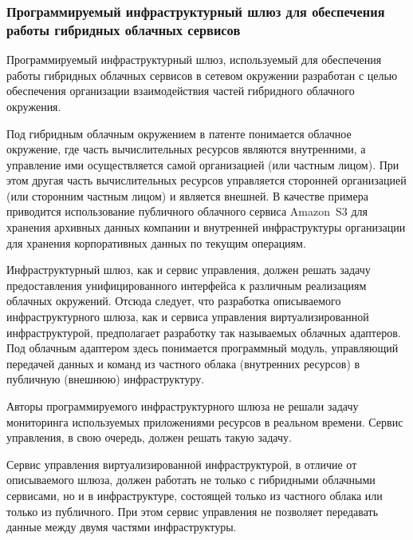 \subsubsection{Программируемый инфраструктурный шлюз для обеспечения работы гибридных облачных сервисов}
Программируемый инфраструктурный шлюз, используемый для обеспечения работы гибридных облачных сервисов в сетевом окружении\cite{programmable-infrastructure-gateway} разработан с целью обеспечения организации взаимодействия частей гибридного облачного окружения.

Под гибридным облачным окружением в патенте понимается облачное окружение, где часть вычислительных ресурсов являются внутренними, а управление ими осуществляется самой организацией (или частным лицом). 
При этом другая часть вычислительных ресурсов управляется сторонней организацией (или сторонним частным лицом) и является внешней. 
В качестве примера приводится использование публичного облачного сервиса Amazon~S3\textsuperscript{\texttrademark} для хранения архивных данных компании и внутренней инфраструктуры организации для хранения корпоративных данных по текущим операциям.

Инфраструктурный шлюз, как и сервис управления, должен решать задачу предоставления унифицированного интерфейса к различным реализациям облачных окружений. 
Отсюда следует, что разработка описываемого инфраструктурного шлюза, как и сервиса управления виртуализированной инфраструктурой, предполагает разработку так называемых облачных адаптеров. 
Под облачным адаптером здесь понимается программный модуль, управляющий передачей данных и команд из частного облака (внутренних ресурсов) в  публичную (внешнюю) инфраструктуру.

Авторы программируемого инфраструктурного шлюза не решали задачу мониторинга используемых приложениями ресурсов в реальном времени. 
Сервис управления, в свою очередь, должен решать такую задачу.

Сервис управления виртуализированной инфраструктурой, в отличие от описываемого шлюза, должен работать не только с гибридными облачными сервисами, но и в инфраструктуре, состоящей только из частного облака или только из публичного.
При этом сервис управления не позволяет передавать данные между двумя частями инфраструктуры.